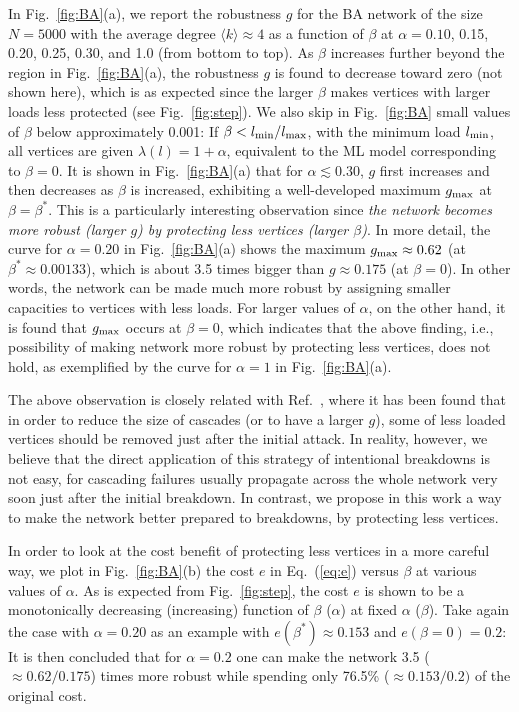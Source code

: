 \documentclass[doublecol]{epl2}
\begin{document}
In Fig.~\ref{fig:BA}(a), we report the robustness $g$ for the BA
network of the size $N=5000$ with the average degree $\langle k
\rangle \approx 4$  as a function of $\beta$ at $\alpha = 0.10$,
0.15, 0.20, 0.25, 0.30, and 1.0 (from bottom to top). As $\beta$
increases further beyond the region in Fig.~\ref{fig:BA}(a), the
robustness $g$ is found to decrease toward zero (not shown here),
which is as expected since the larger $\beta$ makes vertices with
larger loads less protected (see Fig.~\ref{fig:step}). We also skip
in Fig.~\ref{fig:BA} small values of $\beta$ below approximately
0.001: If $\beta < l_{\rm min}/l_{\rm max}$, with the minimum load
$l_{\rm min}$, all vertices are given $\lambda(l) = 1+\alpha$,
equivalent to the ML model corresponding to $\beta=0$. It is shown
in Fig.~\ref{fig:BA}(a) that for $\alpha\lesssim{0.30}$, $g$ first
increases and then decreases as $\beta$ is increased, exhibiting a
well-developed maximum $g_{\rm max}$ at $\beta = \beta^*$. This is a
particularly interesting observation since {\em the network becomes
more robust (larger $g$) by protecting less vertices (larger
$\beta$)}.
In more detail, the curve for $\alpha = 0.20$ in
Fig.~\ref{fig:BA}(a) shows the maximum $g_{\rm max} \approx 0.62$
(at $\beta^* \approx 0.00133$), which is about 3.5 times bigger than
$g\approx 0.175$ (at $\beta = 0$). In other words, the network can
be made much more robust by assigning smaller capacities to vertices
with less loads. For larger values of $\alpha$, on the other hand,
it is found that $g_{\rm max}$ occurs at $\beta = 0$, which
indicates that the above finding, i.e., possibility of making
network more robust by protecting less vertices, does not hold, as
exemplified by the curve for $\alpha = 1$ in Fig.~\ref{fig:BA}(a).

The above observation is closely related with Ref.~\cite{Control1},
where it has been found that in order to reduce the size of cascades
(or to have a larger $g$), some of less loaded vertices should be
removed just after the initial attack. In reality, however, we
believe that the direct application of this strategy of intentional
breakdowns is not easy, for cascading failures usually propagate
across the whole network very soon just after the initial breakdown.
In contrast, we propose in this work a way to make the network
better prepared to breakdowns, by protecting less vertices.


In order to look at the cost benefit of protecting less vertices in
a more careful way, we plot in Fig.~\ref{fig:BA}(b) the cost $e$ in
Eq.~(\ref{eq:e}) versus $\beta$ at various values of $\alpha$. As is
expected from Fig.~\ref{fig:step}, the cost $e$ is shown to be a
monotonically decreasing (increasing) function of $\beta$ ($\alpha$)
at fixed $\alpha$ ($\beta$). Take again the case with $\alpha =
0.20$ as an example with $e(\beta^*) \approx 0.153$ and $e(\beta=0)
= 0.2$: It is then concluded that for $\alpha = 0.2$ one can make
the network 3.5 ($\approx 0.62/0.175$) times more robust while
spending only 76.5\% ($\approx 0.153/0.2)$ of the original cost.
\end{document}
